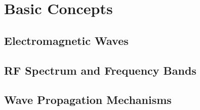 \section{Basic Concepts} \label{sec:basic_concepts}
\subsection{Electromagnetic Waves} \label{subsec:em_waves}
\subsection{RF Spectrum and Frequency Bands} \label{subsec:rf_spectrum}
\subsection{Wave Propagation Mechanisms} \label{subsec:wave_propagation}